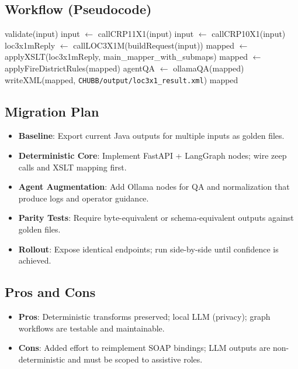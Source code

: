 \documentclass[11pt]{article}
\begin{document}
\subsection{Workflow (Pseudocode)}
\begin{algorithm}
\caption{Python Orchestration with Deterministic Mapping}
\begin{algorithmic}[1]
  \State validate(input) 
    \State input $\gets$ callCRP11X1(input) 
  \EndIf
    \State input $\gets$ callCRP10X1(input) 
  \EndIf
  \State loc3x1mReply $\gets$ callLOC3X1M(buildRequest(input))
  \State mapped $\gets$ applyXSLT(loc3x1mReply, main\_mapper\_with\_submaps) 
  \State mapped $\gets$ applyFireDistrictRules(mapped) 
  \State agentQA $\gets$ ollamaQA(mapped) 
  \State writeXML(mapped, \texttt{CHUBB/output/loc3x1\_result.xml})
  \State \Return mapped
\EndFunction
\end{algorithmic}
\end{algorithm}

\subsection{Migration Plan}
\begin{itemize}
  \item \textbf{Baseline}: Export current Java outputs for multiple inputs as golden files.
  \item \textbf{Deterministic Core}: Implement FastAPI + LangGraph nodes; wire zeep calls and XSLT mapping first.
  \item \textbf{Agent Augmentation}: Add Ollama nodes for QA and normalization that produce logs and operator guidance.
  \item \textbf{Parity Tests}: Require byte-equivalent or schema-equivalent outputs against golden files.
  \item \textbf{Rollout}: Expose identical endpoints; run side-by-side until confidence is achieved.
\end{itemize}

\subsection{Pros and Cons}
\begin{itemize}
  \item \textbf{Pros}: Deterministic transforms preserved; local LLM (privacy); graph workflows are testable and maintainable.
  \item \textbf{Cons}: Added effort to reimplement SOAP bindings; LLM outputs are non-deterministic and must be scoped to assistive roles.
\end{itemize}
\end{document}

